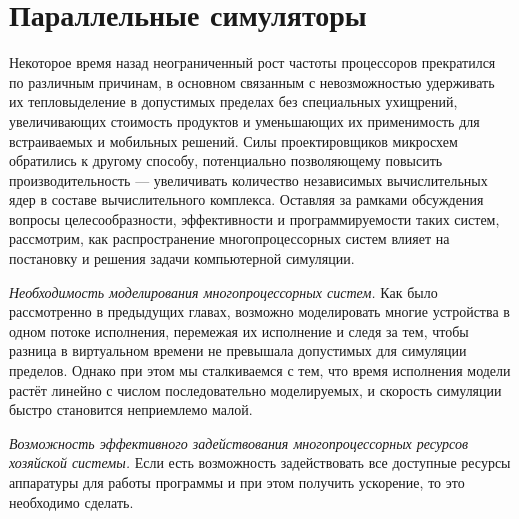 
\chapter{Параллельные симуляторы}\label{parallel}



Некоторое время назад неограниченный рост частоты процессоров прекратился по различным причинам, в основном связанным с невозможностью удерживать их тепловыделение в допустимых пределах без специальных ухищрений, увеличивающих стоимость продуктов и уменьшающих их применимость для встраиваемых и мобильных решений. Силы проектировщиков микросхем обратились к другому способу, потенциально позволяющему повысить производительность — увеличивать количество независимых вычислительных ядер в составе вычислительного комплекса. Оставляя за рамками обсуждения вопросы целесообразности, эффективности и программируемости таких систем, рассмотрим, как распространение многопроцессорных систем влияет на постановку и решения задачи компьютерной симуляции.

\begin{enumerate*}
\item \textit{Необходимость моделирования многопроцессорных систем.} Как было рассмотренно в предыдущих главах, возможно моделировать многие устройства в одном потоке исполнения, перемежая их исполнение и следя за тем, чтобы разница в виртуальном времени не превышала допустимых для симуляции пределов. Однако при этом мы сталкиваемся с тем, что время исполнения модели растёт линейно с числом последовательно моделируемых, и скорость симуляции быстро становится неприемлемо малой.

\item \textit{Возможность эффективного задействования многопроцессорных ресурсов хозяйской системы.} Если есть возможность задействовать все доступные ресурсы аппаратуры для работы программы и при этом получить ускорение, то это необходимо сделать.
\end{enumerate*}

